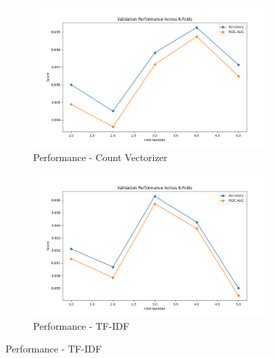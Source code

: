 \begin{figure}[H]
    \centering
    \begin{subfigure}[b]{0.48\textwidth}
        \includegraphics[width=\textwidth]{img/report_info/img/3.1.NaiveBayes/best_bayesian_count.png}
        \caption{Performance - Count Vectorizer}
        \label{fig:nb-count}
    \end{subfigure}
    \begin{subfigure}[b]{0.48\textwidth}
        \includegraphics[width=\textwidth]{img/report_info/img/3.1.NaiveBayes/best_bayesian_tfidf.png}
        \caption{Performance - TF-IDF}
        \label{fig:nb-tfidf}
    \end{subfigure}
    

\end{figure}
